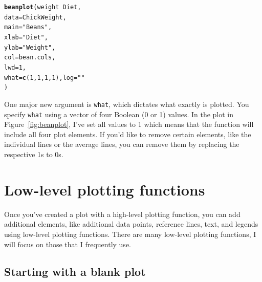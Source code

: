 \documentclass{tufte-book}\usepackage[]{graphicx}\usepackage[]{color}
\makeatletter
\newcommand{\hlnum}[1]{\textcolor[rgb]{0.686,0.059,0.569}{#1}}%
\newcommand{\hlstr}[1]{\textcolor[rgb]{0.192,0.494,0.8}{#1}}%
\newcommand{\hlopt}[1]{\textcolor[rgb]{0,0,0}{#1}}%
\newcommand{\hlstd}[1]{\textcolor[rgb]{0.345,0.345,0.345}{#1}}%
\newcommand{\hlkwc}[1]{\textcolor[rgb]{0.333,0.667,0.333}{#1}}%
\newcommand{\hlkwd}[1]{\textcolor[rgb]{0.737,0.353,0.396}{\textbf{#1}}}%
\newenvironment{kframe}{%
 \def\at@end@of@kframe{}%
 \ifinner\ifhmode%
  \def\at@end@of@kframe{\end{minipage}}%
  \begin{minipage}{\columnwidth}%
 \fi\fi%
 \def\FrameCommand##1{\hskip\@totalleftmargin \hskip-\fboxsep
 \colorbox{shadecolor}{##1}\hskip-\fboxsep
     \hskip-\linewidth \hskip-\@totalleftmargin \hskip\columnwidth}%
 \MakeFramed {\advance\hsize-\width
   \@totalleftmargin\z@ \linewidth\hsize
   \@setminipage}}%
 {\par\unskip\endMakeFramed%
 \at@end@of@kframe}
\newenvironment{knitrout}{}{} %
\makeatother
\begin{document}
\begin{footnotesize}
\begin{footnotesize}
\begin{knitrout}
\begin{kframe}
\begin{alltt}
\hlkwd{beanplot}\hlstd{(weight} \hlopt{~} \hlstd{Diet,}
         \hlkwc{data} \hlstd{= ChickWeight,}
         \hlkwc{main} \hlstd{=} \hlstr{"Beans"}\hlstd{,}
         \hlkwc{xlab} \hlstd{=} \hlstr{"Diet"}\hlstd{,}
         \hlkwc{ylab} \hlstd{=} \hlstr{"Weight"}\hlstd{,}
         \hlkwc{col} \hlstd{= bean.cols ,}
         \hlkwc{lwd} \hlstd{=} \hlnum{1}\hlstd{,}
         \hlkwc{what} \hlstd{=} \hlkwd{c}\hlstd{(}\hlnum{1}\hlstd{,} \hlnum{1}\hlstd{,} \hlnum{1}\hlstd{,} \hlnum{1}\hlstd{),} \hlkwc{log} \hlstd{=} \hlstr{""}
         \hlstd{)}
\end{alltt}
\end{kframe}
\end{knitrout}
\end{footnotesize}

One major new argument is \texttt{what}, which dictates what exactly is plotted. You specify \texttt{what} using a vector of four Boolean (0 or 1) values. In the plot in Figure~\ref{fig:beanplot}, I've set all values to 1 which means that the function will include all four plot elements. If you'd like to remove certain elements, like the individual lines or the average lines, you can remove them by replacing the respective 1s to 0s.





\section{Low-level plotting functions}

Once you've created a plot with a high-level plotting function, you can add additional elements, like additional data points, reference lines, text, and legends using low-level plotting functions. There are many low-level plotting functions, I will focus on those that I frequently use.

\subsection{Starting with a blank plot}



\end{footnotesize}
\end{document}
